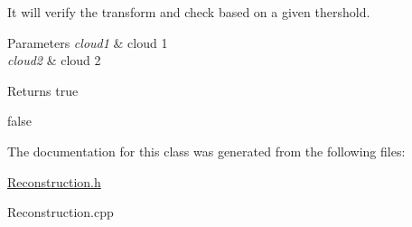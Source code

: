 It will verify the transform and check based on a given thershold. 


\begin{DoxyParams}{Parameters}
{\em cloud1} & cloud 1 \\
\hline
{\em cloud2} & cloud 2 \\
\hline
\end{DoxyParams}
\begin{DoxyReturn}{Returns}
true 

false 
\end{DoxyReturn}


The documentation for this class was generated from the following files\+:\begin{DoxyCompactItemize}
\item 
\hyperlink{Reconstruction_8h}{Reconstruction.\+h}\item 
Reconstruction.\+cpp\end{DoxyCompactItemize}
